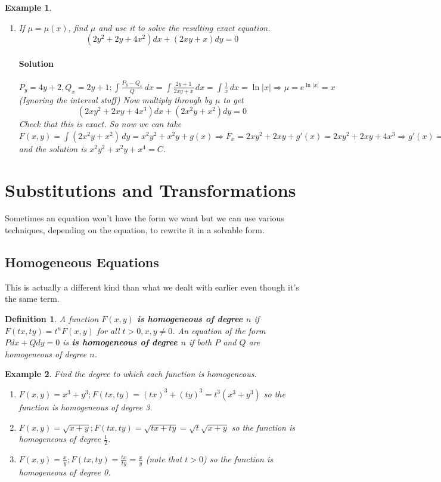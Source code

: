 \documentclass[letterpaper, 11pt, openany]{book}
\theoremstyle{mytheoremstyle}
\newtheorem{definition}{Definition}[section]
\theoremstyle{myexamplestyle}
\newtheorem{example}{Example}[section]
\newenvironment{solution}{\paragraph{\sffamily \smaller \fontseries{b}\selectfont Solution}}{\hfill\faSquare}
\begin{document}
\begin{example}
    \begin{enumerate}
        \item If \(\mu = \mu(x)\), find \(\mu\) and use it to solve the resulting exact equation.
        \[(2y^{2} + 2y + 4x^{2})dx + (2xy + x)dy = 0\]
        \begin{solution}
            \(\displaystyle P_{y} = 4y+2, Q_{x} = 2y+1; \int \frac{P_{y} - Q_{x}}{Q} \, dx = \int \frac{2y+1}{2xy + x}\, dx = \int \frac{1}{x}\, dx = \ln |x| \Rightarrow \mu = e^{\ln |x|} = x\) (Ignoring the interval stuff) Now multiply through by \(\mu\) to get
            \[(2xy^{2} + 2xy + 4x^{3})dx + (2x^{2}y + x^{2})dy = 0\]
            Check that this is exact. So now we can take \(\displaystyle F(x,y) = \int \left(2x^{2}y + x^{2}\right)\, dy = x^{2}y^{2}+x^{2}y + g(x) \Rightarrow F_{x} = 2xy^{2} + 2xy + g'(x) = 2xy^{2} + 2xy + 4x^{3} \Rightarrow g'(x) = 4x^{3} \Rightarrow g(x) = x^{4}\) and the solution is \(x^{2}y^{2}+x^{2}y + x^{4} = C\).
        \end{solution}
    \end{enumerate}
\end{example}

\section{Substitutions and Transformations}
\setcounter{figure}{0}
Sometimes an equation won't have the form we want but we can use various techniques, depending on the equation, to rewrite it in a solvable form.

\subsection{Homogeneous Equations}
This is actually a different kind than what we dealt with earlier even though it's the same term.
\begin{definition}\label{d:de-homogeneuous-deg-n}
    A function \(F(x,y)\) \textbf{is homogeneous of degree \(n\)} if \(F(tx, ty) = t^{n} F(x,y)\) for all \(t>0, x,y \neq 0\). An equation of the form \(P dx + Q dy = 0\) is \textbf{is homogeneous of degree \(n\)} if both \(P\) and \(Q\) are homogeneous of degree \(n\).
\end{definition}

\begin{example}\label{e:de-homogeneous-deg-n}
    Find the degree to which each function is homogeneous.
    \begin{enumerate}
        \item \(F(x,y) = x^{3} + y^{3}; F(tx, ty) = (tx)^{3} + (ty)^{3} = t^{3}(x^{3} + y^{3})\) so the function is homogeneous of degree 3.
        \item \(F(x,y) = \sqrt{x+y}; F(tx, ty) = \sqrt{tx + ty} = \sqrt{t}\sqrt{x+y}\) so the function is homogeneous of degree \(\frac{1}{2}\).
        \item \(F(x,y) = \frac{x}{y}; F(tx, ty) = \frac{tx}{ty} = \frac{x}{y}\) (note that \(t>0\)) so the function is homogeneous of degree 0.
    \end{enumerate}
\end{example}
\end{document}
